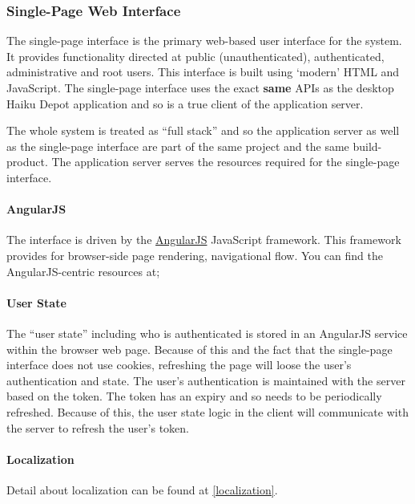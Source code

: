 \subsubsection{Single-Page Web Interface}

The single-page interface is the primary web-based user interface for the system.  It provides functionality directed at public (unauthenticated), authenticated, administrative and root users.  This interface is built using `modern' HTML and JavaScript.  The single-page interface uses the exact {\bf same} APIs as the desktop Haiku Depot application and so is a true client of the application server.

The whole system is treated as ``full stack'' and so the application server as well as the single-page interface are part of the same project and the same build-product.  The application server serves the resources required for the single-page interface.

\paragraph{AngularJS}

The interface is driven by the \href{https://angularjs.org/}{AngularJS} JavaScript framework.  This framework provides for browser-side page rendering, navigational flow.  You can find the AngularJS-centric resources at;


\paragraph{User State}

The ``user state'' including who is authenticated is stored in an AngularJS service within the browser web page.  Because of this and the fact that the single-page interface does not use cookies, refreshing the page will loose the user's authentication and state.  The user's authentication is maintained with the server based on the token.  The token has an expiry and so needs to be periodically refreshed.  Because of this, the user state logic in the client will communicate with the server to refresh the user's token.

\paragraph{Localization}

Detail about localization can be found at \ref{localization}.

